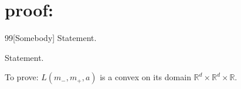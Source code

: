 \section{proof:}
\theoremstyle{plain}




\begin{customthm}{99}[Somebody]\label{ninetynine}
Statement.
\end{customthm}

\begin{customthm}[]\label{ninetynine}
Statement.
\end{customthm}


\begin{lemma}
To prove: $L(m_-,m_+,a)$ is a convex on its domain $\mathbb{R}^d \times \mathbb{R}^d \times \mathbb{R}$.
\end{lemma}
 

